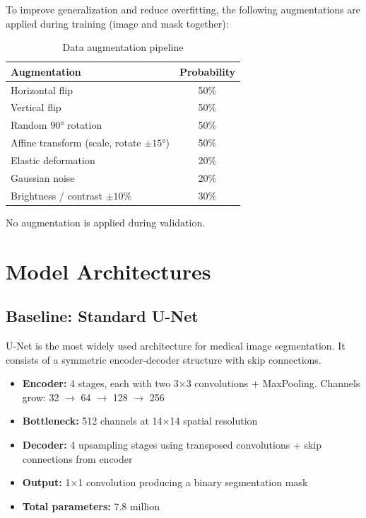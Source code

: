 \documentclass[12pt, a4paper]{article}
\begin{document}
To improve generalization and reduce overfitting, the following augmentations are applied during training (image and mask together):

\begin{table}[H]
    \centering
    \caption{Data augmentation pipeline}
    \begin{tabular}{lc}
        \toprule
        \textbf{Augmentation} & \textbf{Probability} \\
        \midrule
        Horizontal flip & 50\% \\
        Vertical flip & 50\% \\
        Random 90° rotation & 50\% \\
        Affine transform (scale, rotate $\pm15°$) & 50\% \\
        Elastic deformation & 20\% \\
        Gaussian noise & 20\% \\
        Brightness / contrast $\pm10\%$ & 30\% \\
        \bottomrule
    \end{tabular}
\end{table}

No augmentation is applied during validation.

\section{Model Architectures}

\subsection{Baseline: Standard U-Net}

U-Net \cite{ronneberger2015} is the most widely used architecture for medical image segmentation. It consists of a symmetric encoder-decoder structure with skip connections.

\begin{itemize}
    \item \textbf{Encoder:} 4 stages, each with two 3$\times$3 convolutions + MaxPooling. Channels grow: 32 $\to$ 64 $\to$ 128 $\to$ 256
    \item \textbf{Bottleneck:} 512 channels at 14$\times$14 spatial resolution
    \item \textbf{Decoder:} 4 upsampling stages using transposed convolutions + skip connections from encoder
    \item \textbf{Output:} 1$\times$1 convolution producing a binary segmentation mask
    \item \textbf{Total parameters:} 7.8 million
\end{itemize}
\end{document}
